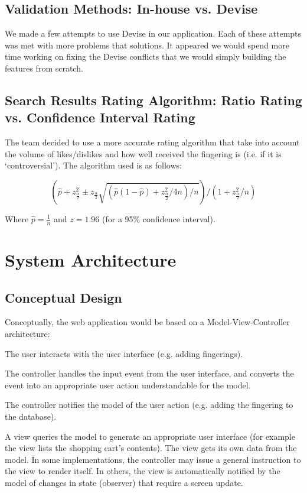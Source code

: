 \documentclass[12pt,english]{article}
\begin{document}
\subsection{Validation Methods: In-house vs. Devise}

We made a few attempts to use Devise in our application. Each of these
attempts was met with more problems that solutions.  It appeared we
would spend more time working on fixing the Devise conflicts that we
would simply building the features from scratch.


\subsection{Search Results Rating Algorithm: Ratio Rating vs. Confidence Interval Rating}

The team decided to use a more accurate rating algorithm that take
into account the volume of likes/dislikes and how well received the
fingering is (i.e. if it is `controversial'). The algorithm used is
as follows:

\[
(\hat{p}+z_{\frac{\alpha}{2}}^{2}\pm z_{\frac{\alpha}{2}}\sqrt{(\hat{p}(1-\hat{p})+z_{\frac{\alpha}{2}}^{2}/4n)/n})/(1+z_{\frac{\alpha}{2}}^{2}/n)
\]


Where $\hat{p}=\frac{1}{n}$ and $z=1.96$ (for a 95\% confidence
interval).


\section{System Architecture}


\subsection{Conceptual Design}

Conceptually, the web application would be based on a Model-View-Controller
architecture: 

The user interacts with the user interface (e.g. adding fingerings). 

The controller handles the input event from the user interface, and
converts the event into an appropriate user action understandable
for the model. 

The controller notifies the model of the user action (e.g. adding
the fingering to the database).

A view queries the model to generate an appropriate user interface
(for example the view lists the shopping cart's contents). The view
gets its own data from the model. In some implementations, the controller
may issue a general instruction to the view to render itself. In others,
the view is automatically notified by the model of changes in state
(observer) that require a screen update. 
\end{document}

